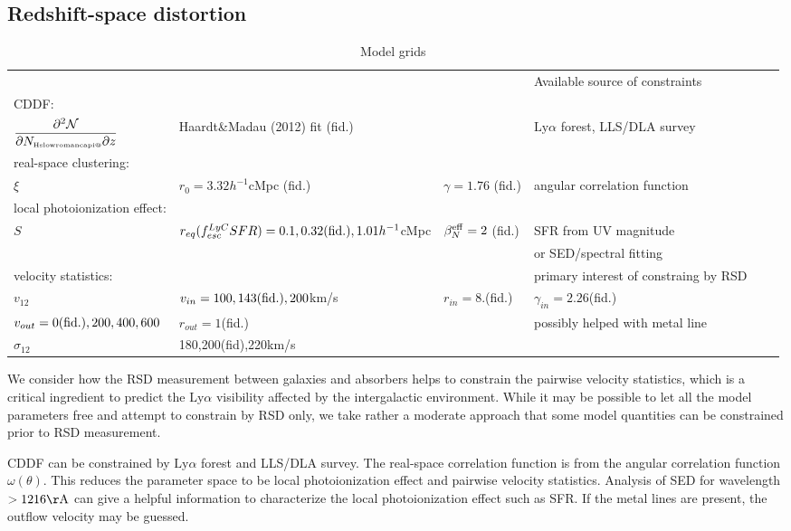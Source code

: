 \documentclass[useAMS,usenatbib,twocolumn]{mn2e}
\makeatletter
\newcommand{\Rmnum}[1]{\expandafter\@slowromancap\romannumeral #1@}
\newcommand{\LyA}{\mbox{Ly}\alpha}
\newcommand{\NHI}{N_{\mbox{\tiny H\Rmnum{1}}}}
\makeatother
\begin{document}
\subsection{Redshift-space distortion}


\begin{table}
\centering
\caption{Model grids}
\label{table:model_grids}
\begin{tabular}{llllll}
\hline
&&& Available source of constraints \\
CDDF: \\
$\displaystyle\frac{\partial^2\mathcal{N}}{\partial\NHI\partial z}$ & Haardt\&Madau (2012) fit (fid.)
&& $\LyA$ forest, LLS/DLA survey\\
real-space clustering: \\
$\xi$   &  $r_0=3.32h^{-1}$cMpc (fid.)     & $\gamma=1.76$ (fid.)   &   angular correlation function\\
local photoionization effect: \\
$S$     &  $r_{eq}(f_{esc}^{LyC}SFR)=0.1,0.32({\rm{fid.}}),1.01h^{-1}$cMpc   & $\beta_N^{\rm{eff}}=2$ (fid.) 
& SFR from UV magnitude \\
&&& or SED/spectral fitting\\ 
velocity statistics: & & & primary interest of constraing by RSD\\
$v_{12}$ &  $v_{in}=100,143({\rm{fid.}}),200$km/s & $r_{in}=8.$(fid.) & $\gamma_{in}=2.26$(fid.) \\
$v_{out}=0({\rm{fid.}}),200,400,600$ & $r_{out}=1$(fid.) & & possibly helped with metal line\\
$\sigma_{12}$ &180,200(fid),220km/s  \\
\hline
\end{tabular}

\end{table}

We consider how the RSD measurement between galaxies and absorbers helps to constrain
the pairwise velocity statistics, which is a critical ingredient to predict the 
$\LyA$ visibility affected by the intergalactic environment. While it may be 
possible to let all the model parameters free and attempt to constrain by RSD only,
we take rather a moderate approach that some model quantities can be constrained 
prior to RSD measurement. 

CDDF can be constrained by $\LyA$ forest and LLS/DLA survey. The real-space correlation
function is from the angular correlation function $\omega(\theta)$. This reduces
the parameter space to be local photoionization effect and pairwise velocity statistics.
Analysis of SED for wavelength $>1216\rm{\AA}$ can give a helpful information to characterize
the local photoionization effect such as SFR. If the metal lines are present, the outflow
velocity may be guessed.
\end{document}
